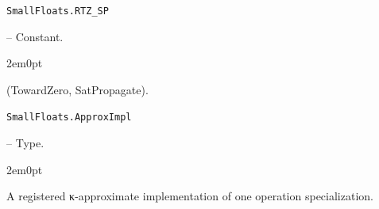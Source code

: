 \par\medskip\noindent\begin{minipage}{\linewidth}
\hypertarget{7796365331314406520}{\texttt{SmallFloats.RTZ\_\allowbreak{}SP}}  -- {Constant.}
\nopagebreak
\begin{adjustwidth}{2em}{0pt}

(TowardZero, SatPropagate).



\end{adjustwidth}
\end{minipage}
\par\medskip

\par\medskip\noindent\begin{minipage}{\linewidth}
\hypertarget{17988065543319926718}{\texttt{SmallFloats.ApproxImpl}}  -- {Type.}
\nopagebreak
\begin{adjustwidth}{2em}{0pt}

A registered κ-approximate implementation of one operation specialization.



\end{adjustwidth}
\end{minipage}
\par\medskip


